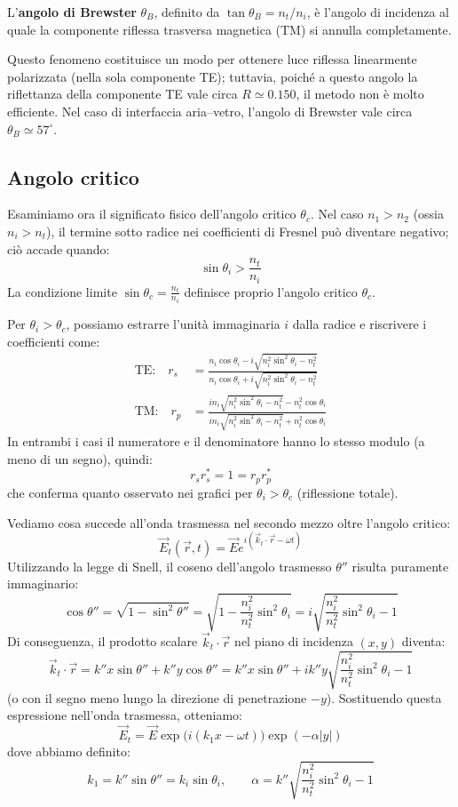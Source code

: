 \documentclass[openany,a4paper,12pt]{book}
\begin{document}
\begin{definizione}[title=Angolo di Brewster]
    L'\textbf{angolo di Brewster} $\theta_B$, definito da $\tan\theta_B = n_t / n_i$, è l'angolo di incidenza al quale la componente riflessa trasversa magnetica (TM) si annulla completamente.
\end{definizione}

Questo fenomeno costituisce un modo per ottenere luce riflessa linearmente polarizzata (nella sola componente TE); tuttavia, poiché a questo angolo la riflettanza della componente TE vale circa $R \simeq \num{0.150}$, il metodo non è molto efficiente. Nel caso di interfaccia aria--vetro, l'angolo di Brewster vale circa $\theta_B \simeq 57^\circ$.

\subsection*{Angolo critico}

Esaminiamo ora il significato fisico dell'angolo critico $\theta_c$. Nel caso $n_1 > n_2$ (ossia $n_i > n_t$), il termine sotto radice nei coefficienti di Fresnel può diventare negativo; ciò accade quando:
\[
    \sin\theta_i > \frac{n_t}{n_i}
\]
La condizione limite $\sin\theta_c = \frac{n_t}{n_i}$ definisce proprio l'angolo critico $\theta_c$.

Per $\theta_i > \theta_c$, possiamo estrarre l'unità immaginaria $i$ dalla radice e riscrivere i coefficienti come:
\begin{align*}
    \text{TE:} \quad r_s &= \frac{n_i \cos\theta_i - i \sqrt{n_i^2 \sin^2\theta_i - n_t^2}}{n_i \cos\theta_i + i \sqrt{n_i^2 \sin^2\theta_i - n_t^2}} \\
    \text{TM:} \quad r_p &= \frac{i n_i \sqrt{n_i^2 \sin^2\theta_i - n_t^2} - n_t^2 \cos\theta_i}{i n_i \sqrt{n_i^2 \sin^2\theta_i - n_t^2} + n_t^2 \cos\theta_i}
\end{align*}
In entrambi i casi il numeratore e il denominatore hanno lo stesso modulo (a meno di un segno), quindi:
\[
    r_s r_s^* = 1 = r_p r_p^*
\]
che conferma quanto osservato nei grafici per $\theta_i > \theta_c$ (riflessione totale).

Vediamo cosa succede all'onda trasmessa nel secondo mezzo oltre l'angolo critico:
\[
    \vec{E}_t(\vec{r}, t) = \vec{E} e^{i(\vec{k}_t \cdot \vec{r} - \omega t)}
\]
Utilizzando la legge di Snell, il coseno dell'angolo trasmesso $\theta''$ risulta puramente immaginario:
\[
    \cos\theta'' = \sqrt{1 - \sin^2\theta''} = \sqrt{1 - \frac{n_i^2}{n_t^2} \sin^2\theta_i} = i \sqrt{\frac{n_i^2}{n_t^2} \sin^2\theta_i - 1}
\]
Di conseguenza, il prodotto scalare $\vec{k}_t \cdot \vec{r}$ nel piano di incidenza $(x,y)$ diventa:
\[
    \vec{k}_t \cdot \vec{r} = k'' x \sin\theta'' + k'' y \cos\theta'' = k'' x \sin\theta'' + i k'' y \sqrt{\frac{n_i^2}{n_t^2} \sin^2\theta_i - 1}
\]
(o con il segno meno lungo la direzione di penetrazione $-y$). Sostituendo questa espressione nell'onda trasmessa, otteniamo:
\[
    \vec{E}_t = \vec{E} \exp\bigl(i(k_1 x - \omega t)\bigr) \exp(-\alpha |y|)
\]
dove abbiamo definito:
\[
    k_1 = k'' \sin\theta'' = k_i \sin\theta_i, \qquad \alpha = k'' \sqrt{\frac{n_i^2}{n_t^2} \sin^2\theta_i - 1}
\]
\end{document}
